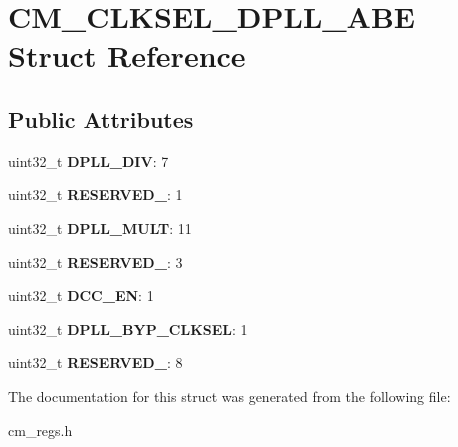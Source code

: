 \hypertarget{structCM__CLKSEL__DPLL__ABE}{\section{C\-M\-\_\-\-C\-L\-K\-S\-E\-L\-\_\-\-D\-P\-L\-L\-\_\-\-A\-B\-E Struct Reference}
\label{structCM__CLKSEL__DPLL__ABE}
}
\subsection*{Public Attributes}
\begin{DoxyCompactItemize}
\item 
\hypertarget{structCM__CLKSEL__DPLL__ABE_ae67fe5dd87e7d0cad349a779a0f34aab}{uint32\-\_\-t {\bfseries D\-P\-L\-L\-\_\-\-D\-I\-V}\-: 7}\label{structCM__CLKSEL__DPLL__ABE_ae67fe5dd87e7d0cad349a779a0f34aab}

\item 
\hypertarget{structCM__CLKSEL__DPLL__ABE_a5c1c6cceb625e52db28316ca6993a55b}{uint32\-\_\-t {\bfseries R\-E\-S\-E\-R\-V\-E\-D\-\_}\-: 1}\label{structCM__CLKSEL__DPLL__ABE_a5c1c6cceb625e52db28316ca6993a55b}

\item 
\hypertarget{structCM__CLKSEL__DPLL__ABE_a80a5c8e498a05cc68cd337f148e3b463}{uint32\-\_\-t {\bfseries D\-P\-L\-L\-\_\-\-M\-U\-L\-T}\-: 11}\label{structCM__CLKSEL__DPLL__ABE_a80a5c8e498a05cc68cd337f148e3b463}

\item 
\hypertarget{structCM__CLKSEL__DPLL__ABE_a4aa9a7c757f5d87389dccb8543f6acf8}{uint32\-\_\-t {\bfseries R\-E\-S\-E\-R\-V\-E\-D\-\_}\-: 3}\label{structCM__CLKSEL__DPLL__ABE_a4aa9a7c757f5d87389dccb8543f6acf8}

\item 
\hypertarget{structCM__CLKSEL__DPLL__ABE_a7f961924b14a5a78f19470a1bde6d14c}{uint32\-\_\-t {\bfseries D\-C\-C\-\_\-\-E\-N}\-: 1}\label{structCM__CLKSEL__DPLL__ABE_a7f961924b14a5a78f19470a1bde6d14c}

\item 
\hypertarget{structCM__CLKSEL__DPLL__ABE_a9326c67cd9a261302bb46e1e3023e227}{uint32\-\_\-t {\bfseries D\-P\-L\-L\-\_\-\-B\-Y\-P\-\_\-\-C\-L\-K\-S\-E\-L}\-: 1}\label{structCM__CLKSEL__DPLL__ABE_a9326c67cd9a261302bb46e1e3023e227}

\item 
\hypertarget{structCM__CLKSEL__DPLL__ABE_a8d646e0044f6a973124bc3527c3899c5}{uint32\-\_\-t {\bfseries R\-E\-S\-E\-R\-V\-E\-D\-\_}\-: 8}\label{structCM__CLKSEL__DPLL__ABE_a8d646e0044f6a973124bc3527c3899c5}

\end{DoxyCompactItemize}


The documentation for this struct was generated from the following file\-:\begin{DoxyCompactItemize}
\item 
cm\-\_\-regs.\-h\end{DoxyCompactItemize}
